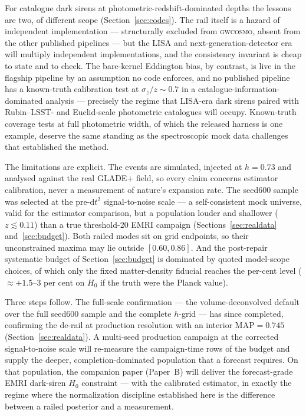 For catalogue dark sirens at photometric-redshift-dominated depths the
lessons are two, of different scope (Section~\ref{sec:codes}).  The
rail itself is a hazard of independent implementation --- structurally
excluded from \textsc{gwcosmo}, absent from the other published
pipelines --- but the LISA and next-generation-detector era will
multiply independent implementations, and the consistency invariant is
cheap to state and to check.  The bare-kernel Eddington bias, by
contrast, is live in the flagship pipeline by an assumption no code
enforces, and no published pipeline has a known-truth calibration test
at $\sigma_z/z \sim 0.7$ in a catalogue-information-dominated analysis
--- precisely the regime that LISA-era dark sirens paired with
Rubin--LSST- and Euclid-scale photometric catalogues will occupy.
Known-truth coverage tests at full photometric width, of which the
released harness is one example, deserve the same standing as the
spectroscopic mock data challenges that established the method.

The limitations are explicit.  The events are simulated, injected at
$h = 0.73$
and analysed against the real GLADE+ field, so every claim concerns
estimator calibration, never a measurement of nature's expansion rate.
The seed600 sample was selected at the pre-$\mathrm{d}t^2$
signal-to-noise scale --- a self-consistent mock universe, valid for
the estimator comparison, but a population louder and shallower
($z \lesssim 0.11$) than a true threshold-20 EMRI campaign
(Sections~\ref{sec:realdata} and~\ref{sec:budget}).
Both railed modes sit on grid endpoints, so their unconstrained maxima
may lie outside $[0.60, 0.86]$.
And the post-repair systematic budget
of Section~\ref{sec:budget} is dominated by quoted model-scope
choices, of which only the fixed matter-density fiducial reaches the
per-cent level ($\approx +1.5$--$3$ per cent on $H_0$ if the truth
were the Planck value).

Three steps follow.  The full-scale confirmation --- the
volume-deconvolved default over the full seed600 sample and the
complete $h$-grid --- has since completed, confirming the de-rail at
production resolution with an interior $\mathrm{MAP} = 0.745$
(Section~\ref{sec:realdata}).
A multi-seed production campaign at the corrected signal-to-noise
scale will re-measure the campaign-time rows of the budget and supply
the deeper, completion-dominated population that a forecast requires.
On that population, the companion paper (Paper~B) will deliver the
forecast-grade EMRI dark-siren $H_0$ constraint
\citep{Babak:2017tow,LISA:2024hlh} --- with the calibrated estimator,
in exactly the regime where the normalization discipline established
here is the difference between a railed posterior and a measurement.
